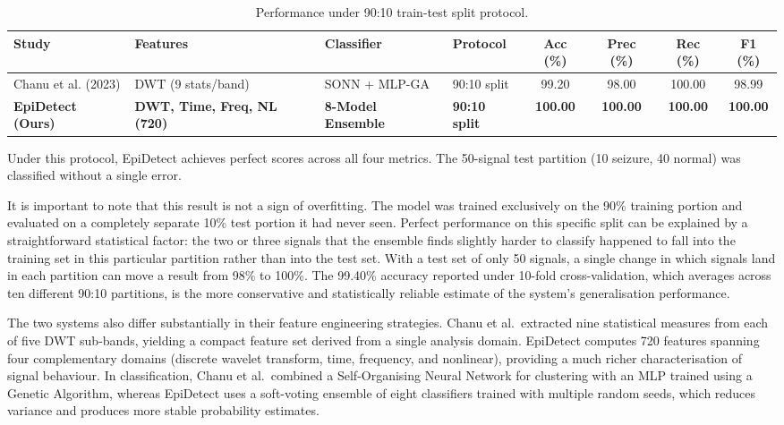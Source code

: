 \begin{table}[htbp]
\centering
\footnotesize
\renewcommand{\arraystretch}{1.5}
\caption{Performance under 90:10 train-test split protocol.}
\label{tab:comp9010}
\begin{tabular}{|p{2.4cm}|p{2.6cm}|p{2.0cm}|p{1.2cm}|c|c|c|c|}
\hline
\textbf{Study} & \textbf{Features} & \textbf{Classifier} & \textbf{Protocol} & \textbf{Acc (\%)} & \textbf{Prec (\%)} & \textbf{Rec (\%)} & \textbf{F1 (\%)} \\
\hline
Chanu et al. (2023) \cite{chanu2023automated} & DWT (9 stats/band) & SONN + MLP-GA & 90:10 split & 99.20 & 98.00 & 100.00 & 98.99 \\
\hline
\textbf{EpiDetect (Ours)} & \textbf{DWT, Time, Freq, NL (720)} & \textbf{8-Model Ensemble} & \textbf{90:10 split} & \textbf{100.00} & \textbf{100.00} & \textbf{100.00} & \textbf{100.00} \\
\hline
\end{tabular}
\end{table}

Under this protocol, EpiDetect achieves perfect scores across all four metrics. The 50-signal test partition (10 seizure, 40 normal) was classified without a single error.

It is important to note that this result is not a sign of overfitting. The model was trained exclusively on the 90\% training portion and evaluated on a completely separate 10\% test portion it had never seen. Perfect performance on this specific split can be explained by a straightforward statistical factor: the two or three signals that the ensemble finds slightly harder to classify happened to fall into the training set in this particular partition rather than into the test set. With a test set of only 50 signals, a single change in which signals land in each partition can move a result from 98\% to 100\%. The 99.40\% accuracy reported under 10-fold cross-validation, which averages across ten different 90:10 partitions, is the more conservative and statistically reliable estimate of the system's generalisation performance.

The two systems also differ substantially in their feature engineering strategies. Chanu et al.\ extracted nine statistical measures from each of five DWT sub-bands, yielding a compact feature set derived from a single analysis domain. EpiDetect computes 720 features spanning four complementary domains (discrete wavelet transform, time, frequency, and nonlinear), providing a much richer characterisation of signal behaviour. In classification, Chanu et al.\ combined a Self-Organising Neural Network for clustering with an MLP trained using a Genetic Algorithm, whereas EpiDetect uses a soft-voting ensemble of eight classifiers trained with multiple random seeds, which reduces variance and produces more stable probability estimates.

